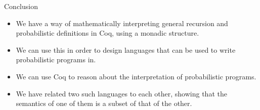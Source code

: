 \documentclass{beamer}
\begin{document}

\begin{frame}{Conclusion}
  \begin{itemize}
      \item We have a way of mathematically interpreting general recursion and
    probabilistic definitions in Coq, using a monadic structure.
    \pause
      \item We can use this in order to design languages that can be used to write
    probabilistic programs in.
    \pause
      \item We can use Coq to reason about the interpretation of probabilistic
    programs.
    \pause
      \item We have related two such languages to each other, showing that the
    semantics of one of them is a subset of that of the other. 
  \end{itemize}
\end{frame}




\end{document}

